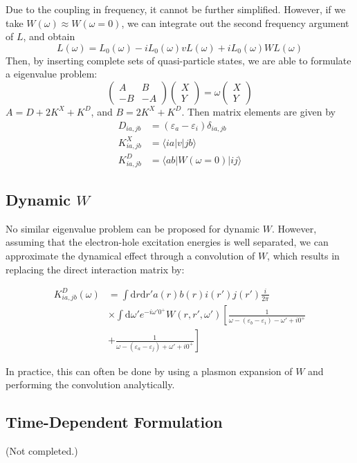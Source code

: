 \documentclass{article}
\begin{document}
Due to the coupling in frequency, it cannot be further simplified. However, if we take $W(\omega)\approx W(\omega=0)$, we can integrate out the second frequency argument of $L$, and obtain
$$
L(\omega)=L_0(\omega)-iL_0(\omega)vL(\omega)+iL_0(\omega)WL(\omega)
$$
Then, by inserting complete sets of quasi-particle states, we are able to formulate a eigenvalue problem:
$$
\begin{pmatrix}A&B\\-B&-A\end{pmatrix}
\begin{pmatrix}X\\Y\end{pmatrix}=\omega
\begin{pmatrix}X\\Y\end{pmatrix}
$$
$A=D+2K^X+K^D$, and $B=2K^X+K^D$. Then matrix elements are given by
$$
\begin{aligned}
D_{ia,jb}&=(\varepsilon_a-\varepsilon_i)\delta_{ia,jb}\\
K^X_{ia,jb}&=\langle ia|v|jb\rangle\\
K^D_{ia,jb}&=\langle ab|W(\omega=0)|ij\rangle
\end{aligned}
$$
\subsection{Dynamic $W$}
No similar eigenvalue problem can be proposed for dynamic $W$. However, assuming that the electron-hole excitation energies is well separated, we can approximate the dynamical effect through a convolution of $W$, which results in replacing the direct interaction matrix by:

$$
\begin{aligned}
K^D_{ia,jb}(\omega)&=\int\mathrm dr\mathrm dr'a(r)b(r)i(r')j(r')\frac{i}{2\pi}\\
&\times\int\mathrm d\omega'e^{-i\omega' 0^+}W(r,r',\omega')\left[\frac1{\omega-(\varepsilon_b-\varepsilon_i)-\omega'+i0^+}\right.\\
&\left.+\frac1{\omega-(\varepsilon_a-\varepsilon_j)+\omega'+i0^+}\right]
\end{aligned}
$$

In practice, this can often be done by using a plasmon expansion of $W$ and performing the convolution analytically.
\subsection{Time-Dependent Formulation}
(Not completed.)
\end{document}
